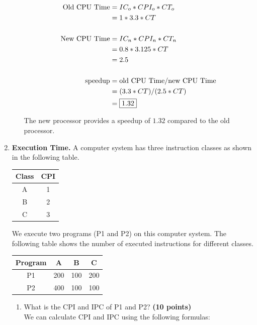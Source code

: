 \documentclass[a4paper, 15pt]{exam}
\begin{document}
\begin{enumerate}
\begin{enumerate}
   	\begin{align*} 
   			\text{Old CPU Time} &= IC_o * CPI_o * CT_o \\
   			&= 1 * 3.3 * CT \\ \\			
   			\text{New CPU Time} &= IC_n * CPI_n * CT_n \\
   			&= 0.8 * 3.125 * CT \\
   			&= 2.5 \\ \\
   			\text{speedup} &= \text{old CPU Time} / \text{new CPU Time} \\
   			&= (3.3 * CT) / (2.5 * CT) \\ 
   			&= \fbox{1.32}
   	\end{align*}
   	
   	The new processor provides a speedup of $1.32$ compared to the old processor.

	\end{enumerate}
    \item \textbf{Execution Time.} A computer system has three instruction classes as shown in the following table.
\begin{center}
\begin{tabular}{ |c|c|} 
 \hline
  
  Class&CPI\\ 
  \hline
 A&1\\ 
 \hline
 B&2\\ 
 \hline
 C&3\\ 
 \hline
\end{tabular}
\end{center}
We execute two programs (P1 and P2) on this computer system. The following table shows the number of executed instructions for different classes.

\begin{center}
\begin{tabular}{ |c|c|c|c|} 
 \hline
  
  Program&A&B&C\\ 
  \hline
 P1&200&100&200\\ 
 \hline
 P2&400&100&100\\ 
 \hline
 
\end{tabular}
\end{center}
\begin{enumerate}
\item What is the CPI and IPC of P1 and P2?
\textbf{(10 points)} \\
We can calculate CPI and IPC using the following formulas:


\end{enumerate}
\end{enumerate}
\end{document}
